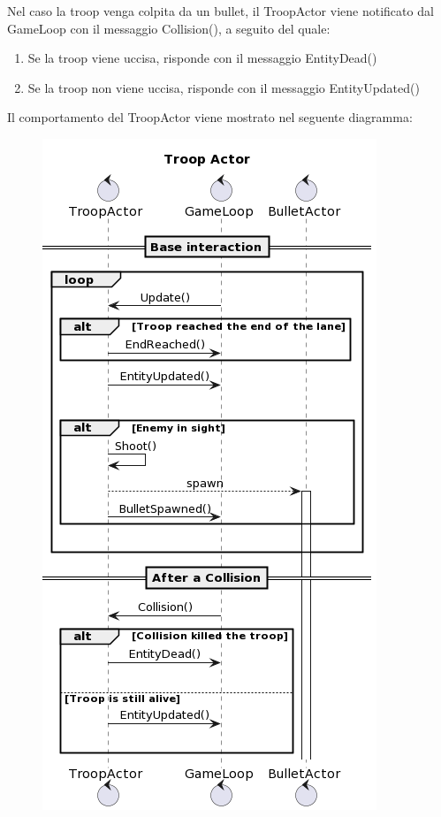 Nel caso la troop venga colpita da un bullet, il TroopActor viene notificato dal GameLoop con il messaggio Collision(), a seguito del quale:

\begin{enumerate}
    \item Se la troop viene uccisa, risponde con il messaggio EntityDead()
    \item Se la troop non viene uccisa, risponde con il messaggio EntityUpdated()
\end{enumerate}

Il comportamento del TroopActor viene mostrato nel seguente diagramma:

\begin{figure}[H]
    \centering
    \includegraphics[width=0.8\linewidth]{images/troop-actor.png}
    \label{Diagramma di sequenza del Troop Actor.}
\end{figure}

